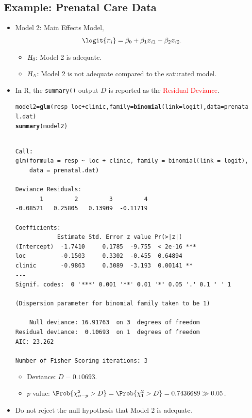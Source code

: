 \documentclass{article}\usepackage[]{graphicx}\usepackage[svgnames]{xcolor}
\makeatletter
\newcommand{\hlopt}[1]{\textcolor[rgb]{0,0,0}{#1}}%
\newcommand{\hlstd}[1]{\textcolor[rgb]{0.345,0.345,0.345}{#1}}%
\newcommand{\hlkwb}[1]{\textcolor[rgb]{0.69,0.353,0.396}{#1}}%
\newcommand{\hlkwc}[1]{\textcolor[rgb]{0.333,0.667,0.333}{#1}}%
\newcommand{\hlkwd}[1]{\textcolor[rgb]{0.737,0.353,0.396}{\textbf{#1}}}%
\newenvironment{kframe}{%
 \def\at@end@of@kframe{}%
 \ifinner\ifhmode%
  \def\at@end@of@kframe{\end{minipage}}%
  \begin{minipage}{\columnwidth}%
 \fi\fi%
 \def\FrameCommand##1{\hskip\@totalleftmargin \hskip-\fboxsep
 \colorbox{shadecolor}{##1}\hskip-\fboxsep
     \hskip-\linewidth \hskip-\@totalleftmargin \hskip\columnwidth}%
 \MakeFramed {\advance\hsize-\width
   \@totalleftmargin\z@ \linewidth\hsize
   \@setminipage}}%
 {\par\unskip\endMakeFramed%
 \at@end@of@kframe}
\newenvironment{knitrout}{}{} %
\newcommand{\HN}{\textsl{H}_{\textsl{0}}}%
\newcommand{\HA}{\textsl{H}_{\textsl{A}}}%
\makeatother
\begin{document}
\subsection*{Example: Prenatal Care Data}
\begin{itemize}
      \item Model 2: Main Effects Model,
            \[ \logit{\pi_i}=\beta_0+\beta_1x_{i1}+\beta_2x_{i2}. \]
            \begin{itemize}
                  \item $ \HN $: Model 2 is adequate.
                  \item $ \HA $: Model 2 is not adequate compared to the saturated model.
            \end{itemize}
      \item In R, the \texttt{summary()} output $ D $ is reported as the \textcolor{Red}{Residual Deviance}.
\begin{knitrout}
\color{fgcolor}\begin{kframe}
\begin{alltt}
\hlstd{model2} \hlkwb{=} \hlkwd{glm}\hlstd{(resp} \hlopt{~} \hlstd{loc} \hlopt{+} \hlstd{clinic,} \hlkwc{family} \hlstd{=} \hlkwd{binomial}\hlstd{(}\hlkwc{link} \hlstd{= logit),} \hlkwc{data} \hlstd{= prenatal.dat)}
\hlkwd{summary}\hlstd{(model2)}
\end{alltt}
\begin{verbatim}

Call:
glm(formula = resp ~ loc + clinic, family = binomial(link = logit), 
    data = prenatal.dat)

Deviance Residuals: 
       1         2         3         4  
-0.08521   0.25805   0.13909  -0.11719  

Coefficients:
            Estimate Std. Error z value Pr(>|z|)    
(Intercept)  -1.7410     0.1785  -9.755  < 2e-16 ***
loc          -0.1503     0.3302  -0.455  0.64894    
clinic       -0.9863     0.3089  -3.193  0.00141 ** 
---
Signif. codes:  0 '***' 0.001 '**' 0.01 '*' 0.05 '.' 0.1 ' ' 1

(Dispersion parameter for binomial family taken to be 1)

    Null deviance: 16.91763  on 3  degrees of freedom
Residual deviance:  0.10693  on 1  degrees of freedom
AIC: 23.262

Number of Fisher Scoring iterations: 3
\end{verbatim}
\end{kframe}
\end{knitrout}
            \begin{itemize}
                  \item Deviance: $ D=0.10693 $.
                  \item $ p $-value: $ \Prob{\chi^2_{n-p}>D}=\Prob{\chi^2_1>D}=0.7436689\gg 0.05 $.
            \end{itemize}
      \item Do not reject the null hypothesis that Model 2 is adequate.
\end{itemize}
\end{document}
